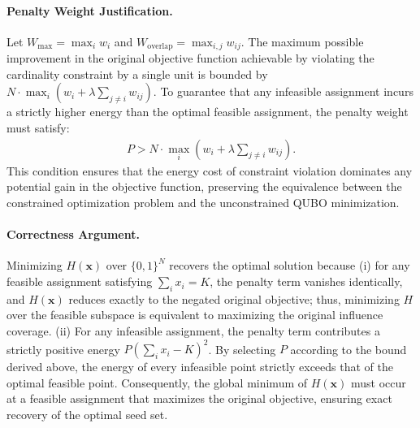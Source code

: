 \documentclass[12pt]{article}
\begin{document}
\paragraph{Penalty Weight Justification.}
Let $W_{\max} = \max_i w_i$ and $W_{\text{overlap}} = \max_{i,j} w_{ij}$. The maximum possible improvement in the original objective function achievable by violating the cardinality constraint by a single unit is bounded by $N \cdot \max_i \left( w_i + \lambda \sum_{j \neq i} w_{ij} \right)$. To guarantee that any infeasible assignment incurs a strictly higher energy than the optimal feasible assignment, the penalty weight must satisfy:
\begin{align}
P > N \cdot \max_i \left( w_i + \lambda \sum_{j \neq i} w_{ij} \right).
\end{align}
This condition ensures that the energy cost of constraint violation dominates any potential gain in the objective function, preserving the equivalence between the constrained optimization problem and the unconstrained QUBO minimization.

\paragraph{Correctness Argument.}
Minimizing $H(\mathbf{x})$ over $\{0,1\}^N$ recovers the optimal solution because (i) for any feasible assignment satisfying $\sum_i x_i = K$, the penalty term vanishes identically, and $H(\mathbf{x})$ reduces exactly to the negated original objective; thus, minimizing $H$ over the feasible subspace is equivalent to maximizing the original influence coverage. (ii) For any infeasible assignment, the penalty term contributes a strictly positive energy $P(\sum_i x_i - K)^2$. By selecting $P$ according to the bound derived above, the energy of every infeasible point strictly exceeds that of the optimal feasible point. Consequently, the global minimum of $H(\mathbf{x})$ must occur at a feasible assignment that maximizes the original objective, ensuring exact recovery of the optimal seed set.
\end{document}
